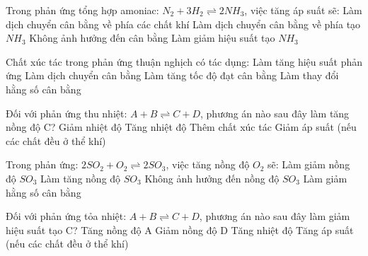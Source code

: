 \begin{ex}
	Trong phản ứng tổng hợp amoniac: $N_2 + 3H_2 \rightleftharpoons 2NH_3$, việc tăng áp suất sẽ:
	\choice
	{Làm dịch chuyển cân bằng về phía các chất khí}
	{\True Làm dịch chuyển cân bằng về phía tạo $NH_3$}
	{Không ảnh hưởng đến cân bằng}
	{Làm giảm hiệu suất tạo $NH_3$}
\end{ex}
\begin{ex}
	Chất xúc tác trong phản ứng thuận nghịch có tác dụng:
	\choice
	{Làm tăng hiệu suất phản ứng}
	{Làm dịch chuyển cân bằng}
	{\True Làm tăng tốc độ đạt cân bằng}
	{Làm thay đổi hằng số cân bằng}
\end{ex}

\begin{ex}
	Đối với phản ứng thu nhiệt: $A + B \rightleftharpoons C + D$, phương án nào sau đây làm tăng nồng độ C?
	\choice
	{Giảm nhiệt độ}
	{\True Tăng nhiệt độ}
	{Thêm chất xúc tác}
	{Giảm áp suất (nếu các chất đều ở thể khí)}
\end{ex}

\begin{ex}
	Trong phản ứng: $2SO_2 + O_2 \rightleftharpoons 2SO_3$, việc tăng nồng độ $O_2$ sẽ:
	\choice
	{Làm giảm nồng độ $SO_3$}
	{\True Làm tăng nồng độ $SO_3$}
	{Không ảnh hưởng đến nồng độ $SO_3$}
	{Làm giảm hằng số cân bằng}
\end{ex}

\begin{ex}
	Đối với phản ứng tỏa nhiệt: $A + B \rightleftharpoons C + D$, phương án nào sau đây làm giảm hiệu suất tạo C?
	\choice
	{Tăng nồng độ A}
	{Giảm nồng độ D}
	{\True Tăng nhiệt độ}
	{Tăng áp suất (nếu các chất đều ở thể khí)}
\end{ex}

